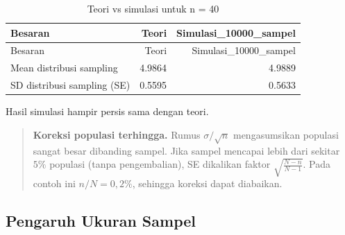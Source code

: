 \documentclass[
  indonesian,
  letterpaper,
]{book}
\begin{document}
\begin{longtable}[]{@{}lrr@{}}
\caption{Teori vs simulasi untuk n = 40}\tabularnewline
\toprule\noalign{}
Besaran & Teori & Simulasi\_10000\_sampel \\
\midrule\noalign{}
\endfirsthead
\toprule\noalign{}
Besaran & Teori & Simulasi\_10000\_sampel \\
\midrule\noalign{}
\endhead
\bottomrule\noalign{}
\endlastfoot
Mean distribusi sampling & 4.9864 & 4.9889 \\
SD distribusi sampling (SE) & 0.5595 & 0.5633 \\
\end{longtable}

Hasil simulasi hampir persis sama dengan teori.

\begin{quote}
\textbf{Koreksi populasi terhingga.} Rumus \(\sigma/\sqrt{n}\)
mengasumsikan populasi sangat besar dibanding sampel. Jika sampel
mencapai lebih dari sekitar \(5\%\) populasi (tanpa pengembalian), SE
dikalikan faktor \(\sqrt{\frac{N-n}{N-1}}\). Pada contoh ini
\(n/N = 0,2\%\), sehingga koreksi dapat diabaikan.
\end{quote}

\subsection{Pengaruh Ukuran Sampel}\label{pengaruh-ukuran-sampel}
\end{document}
